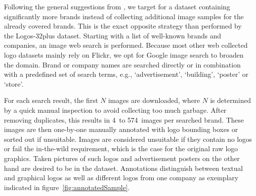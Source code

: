 \documentclass[a4paper,twoside]{article}
\newcommand{\xeg}{e.g.}
\begin{document}
%
Following the general suggestions from \cite{bansal2017}, we target for a dataset containing significantly more brands instead of collecting additional image samples for the already covered brands. This is the exact opposite strategy than performed by the Logos-32plus dataset.
Starting with a list of well-known brands and companies, an image web search is performed. Because most other web collected logo datasets mainly rely on Flickr, we opt for Google image search to broaden the domain. Brand or company names are searched directly or in combination with a predefined set of search terms, \xeg, `advertisement', `building', `poster' or `store'. 

For each search result, the first $N$ images are downloaded, where $N$ is determined by a quick manual inspection to avoid collecting too much garbage. 
After removing duplicates, this results in 4~to 574~images per searched brand. These images are then one-by-one manually annotated with logo bounding boxes or sorted out if unsuitable.
Images are considered unsuitable if they contain no logos or fail the in-the-wild requirement, which is the case for the original raw logo graphics. Taken pictures of such logos and advertisement posters on the other hand are desired to be in the dataset. 
Annotations distinguish between textual and graphical logos as well as different logos from one company as exemplary indicated in figure~\ref{fig:annotatedSample}.
%
\end{document}
